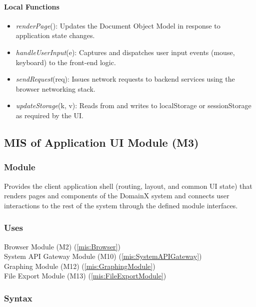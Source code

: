 \documentclass[12pt, titlepage]{article}
\begin{document}
  \paragraph{Local Functions}

  \begin{itemize}
    \item \textit{renderPage}(): Updates the Document Object Model in response to
          application state changes.
    \item \textit{handleUserInput}(e): Captures and dispatches user input events
          (mouse, keyboard) to the front-end logic.
    \item \textit{sendRequest}(req): Issues network requests to backend services
          using the browser networking stack.
    \item \textit{updateStorage}(k, v): Reads from and writes to localStorage or
          sessionStorage as required by the UI.
  \end{itemize}

\subsection{MIS of Application UI Module (M3)}
  \label{mis:ApplicationUI}

  \subsubsection{Module}
  Provides the client application shell (routing, layout, and common UI state) that renders
  pages and components of the DomainX system and connects user interactions to the rest of
  the system through the defined module interfaces.


  \subsubsection{Uses}
  Browser Module (M2) (\ref{mis:Browser})\\
  System API Gateway Module (M10) (\ref{mis:SystemAPIGateway})\\
  Graphing Module (M12) (\ref{mis:GraphingModule})\\
  File Export Module (M13) (\ref{mis:FileExportModule})\\

  \subsubsection{Syntax}
\end{document}
